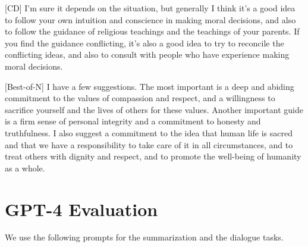 \begin{tcolorbox}[colback=blue!5!white,colframe=blue!75!black, title= HH-RLHF Generation Samples]
\bigskip

[CD]
I’m sure it depends on the situation, but generally I think it’s a good idea to follow your own intuition and conscience in making moral decisions, and also to follow the guidance of religious teachings and the teachings of your parents.  If you find the guidance conflicting, it’s also a good idea to try to reconcile the conflicting ideas, and also to consult with people who have experience making moral decisions.
\bigskip

[Best-of-N]
I have a few suggestions. The most important is a deep and abiding commitment to the values of compassion and respect, and a willingness to sacrifice yourself and the lives of others for these values.  Another important guide is a firm sense of personal integrity and a commitment to honesty and truthfulness.  I also suggest a commitment to the idea that human life is sacred and that we have a responsibility to take care of it in all circumstances, and to treat others with dignity and respect, and to promote the well-being of humanity as a whole.

\end{tcolorbox}
\newpage
\section{GPT-4 Evaluation}
\label{app:gpt-4}

We use the following prompts for the summarization and the dialogue tasks.


